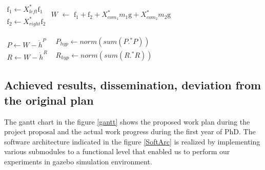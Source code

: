 \documentclass[12pt,a4paper]{report}
\begin{document}
\begin{algorithm}[H]
\begin{algorithmic}[1]
             \vspace*{0.3cm}
             \STATE $\begin{matrix}
             			\text{f}_1 \leftarrow X_{left}^* \text{f}_1 \\
             			\text{f}_2 \leftarrow X_{right}^* \text{f}_2
             		  \end{matrix}$ \hspace*{3.3cm} 
             \vspace*{0.3cm}    
             \STATE $W$ $\leftarrow$ $\text{f}_1 + \text{f}_2 + {X_{{com}_1}^*} m_1 \text{g} + {X_{{com}_2}^*} m_2 \text{g} $ \hspace*{1.3cm} 
             
             \newpage
             
             \vspace*{0.3cm} 
             \STATE $\begin{matrix}
             			P \leftarrow W - \dot{h}^P \\
             			R \leftarrow W - \dot{h}^R
             		  \end{matrix}$
             \vspace*{0.3cm} 
        \ENDFOR
        \vspace*{0.3cm}
        \STATE $\begin{matrix}
        			P_{hyp} \leftarrow norm(sum(P.^*P)) \\
        			R_{hyp} \leftarrow norm(sum(R.^*R))  
        		  \end{matrix}$    
    \end{algorithmic}
\end{algorithm}




\subsection{Achieved results, dissemination, deviation from the original plan}
The gantt chart in the figure \ref{gantt} shows the proposed work plan during the project proposal and the actual work progress during the first year of PhD. The software architecture indicated in the figure \ref{SoftArc} is realized by implementing various submodules to a functional level that enabled us to perform our experiments in gazebo simulation environment.
\end{document}
